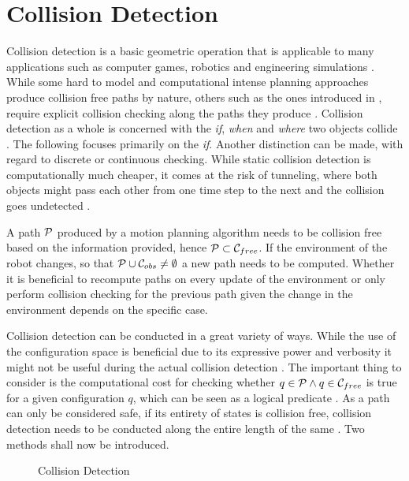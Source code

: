 \chapter{Collision Detection}
Collision detection is a basic geometric operation that is applicable to many applications such as computer games, robotics and engineering simulations \cite{Ericson.2005,Ponamgi.1997,Chazelle.1987}. While some hard to model and computational intense planning approaches produce collision free paths by nature, others such as the ones introduced in , require explicit collision checking along the paths they produce \cite{LaValle.2006}. Collision detection as a whole is concerned with the \emph{if}, \emph{when} and \emph{where} two objects collide \cite{Ericson.2005}. The following focuses primarily on the \emph{if}. Another distinction can be made, with regard to discrete or continuous checking. While static collision detection is computationally much cheaper, it comes at the risk of tunneling, where both objects might pass each other from one time step to the next and the collision goes undetected \cite{Ericson.2005}.

A path $\mathcal{P}$ produced by a motion planning algorithm needs to be collision free based on the information provided, hence $\mathcal{P} \subset \mathcal{C}_{free}$. If the environment of the robot changes, so that $\mathcal{P} \cup \mathcal{C}_{obs} \neq \emptyset$ a new path needs to be computed. Whether it is beneficial to recompute paths on every update of the environment or only perform collision checking for the previous path given the change in the environment depends on the specific case.

Collision detection can be conducted in a great variety of ways. While the use of the configuration space is beneficial due to its expressive power and verbosity it might not be useful during the actual collision detection \cite{LaValle.2006}. The important thing to consider is the computational cost for checking whether $q \in \mathcal{P} \land q \in \mathcal{C}_{free}$ is true for a given configuration $q$, which can be seen as a logical predicate \cite{LaValle.2006}. As a path can only be considered safe, if its entirety of states is collision free, collision detection needs to be conducted along the entire length of the same \cite{LaValle.2006,Ericson.2005}. Two methods shall now be introduced.

\begin{figure}[h]
    \caption{Collision Detection}
    \label{fig:collisionDetection}
\end{figure}

